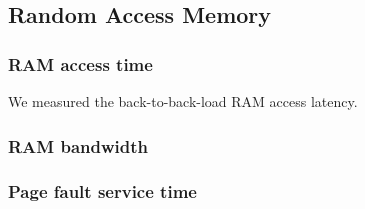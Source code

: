 \subsection{Random Access Memory}

\subsubsection{RAM access time}
We measured the back-to-back-load RAM access latency.




\subsubsection{RAM bandwidth}






\subsubsection{Page fault service time}



















